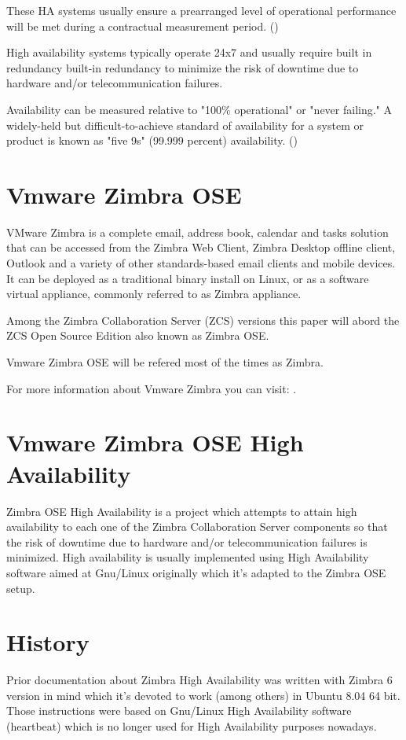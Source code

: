These HA systems usually ensure a prearranged level of operational performance will be met during a contractual measurement period. (\cite{WikipediaHA})

High availability systems typically operate 24x7 and usually require built in redundancy built-in redundancy to minimize the risk of downtime due to hardware and/or telecommunication failures. 

Availability can be measured relative to "100\% operational" or "never failing." A widely-held but difficult-to-achieve standard of availability for a system or product is known as "five 9s" (99.999 percent) availability. (\cite{BCMHA})


\section {Vmware Zimbra OSE}
VMware Zimbra is a complete email, address book, calendar and tasks solution that can be accessed from the Zimbra Web Client, Zimbra Desktop offline client, Outlook and a variety of other standards-based email clients and mobile devices. It can be deployed as a traditional binary install on Linux, or as a software virtual appliance, commonly referred to as Zimbra appliance.

Among the Zimbra Collaboration Server (ZCS) versions this paper will abord the ZCS Open Source Edition also known as Zimbra OSE.

Vmware Zimbra OSE will be refered most of the times as Zimbra.

For more information about Vmware Zimbra you can visit: \cite{ZimbraLearn}.

\section {Vmware Zimbra OSE High Availability}
Zimbra OSE High Availability is a project which attempts to attain high availability to each one of the Zimbra Collaboration Server components so that the risk of downtime due to hardware and/or telecommunication failures is minimized. High availability is usually implemented using High Availability software aimed at Gnu/Linux originally which it's adapted to the Zimbra OSE setup.


\section{History}

Prior documentation about Zimbra High Availability was written with Zimbra 6 version in mind which it's devoted to work (among others) in Ubuntu 8.04 64 bit. Those instructions were based on Gnu/Linux High Availability software (heartbeat) which is no longer used for High Availability purposes nowadays.

